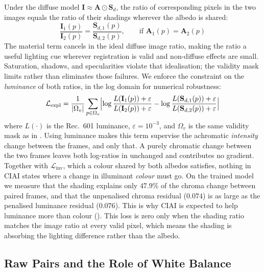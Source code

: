 Under the diffuse model $\mathbf{I} \approx \mathbf{A} \odot \mathbf{S}_d$, the
ratio of corresponding pixels in the two images equals the ratio of their
shadings wherever the albedo is shared:
\begin{equation}
  \frac{\mathbf{I}_1(p)}{\mathbf{I}_2(p)} = \frac{\mathbf{S}_{d,1}(p)}{\mathbf{S}_{d,2}(p)},
  \qquad \text{if } \mathbf{A}_1(p) = \mathbf{A}_2(p)
  \label{eq:explain_ratio}
\end{equation}
The material term cancels in the ideal diffuse image ratio, making the ratio a
useful lighting cue wherever registration is valid and non-diffuse effects are
small. Saturation, shadows, and specularities violate that idealisation; the
validity mask limits rather than eliminates those failures.
We enforce the constraint on the \emph{luminance} of both ratios, in the log
domain for numerical robustness:
\begin{equation}
  \mathcal{L}_{\text{expl}} =
  \frac{1}{|\Omega_v|} \sum_{p \in \Omega_v}
  \Bigl|
    \log\frac{L(\mathbf{I}_1(p)) + \varepsilon}{L(\mathbf{I}_2(p)) + \varepsilon}
  - \log\frac{L(\mathbf{S}_{d,1}(p)) + \varepsilon}{L(\mathbf{S}_{d,2}(p)) + \varepsilon}
  \Bigr|
  \label{eq:lexpl}
\end{equation}
where $L(\cdot)$ is the Rec.~601 luminance, $\varepsilon = 10^{-3}$, and
$\Omega_v$ is the same validity mask as in .
Using luminance makes this term supervise the achromatic \emph{intensity} change
between the frames, and only that. A purely chromatic change between the two frames
leaves both log-ratios in  unchanged and contributes no gradient. Together
with $\mathcal{L}_{\text{inv}}$, which a colour shared by both albedos satisfies, nothing in
CIAI states where a change in illuminant \emph{colour} must go. On the trained model we
measure that the shading explains only $47.9\%$ of the chroma change between paired
frames, and that the unpenalised chroma residual ($0.074$) is as large as the penalised
luminance residual ($0.076$). This is why CIAI is expected to help luminance more than
colour ().
This loss is zero only when the shading ratio matches the image ratio at every
valid pixel, which means the shading is absorbing the lighting difference rather
than the albedo.

\subsection{Raw Pairs and the Role of White Balance}
\label{sec:raw_pairs}

